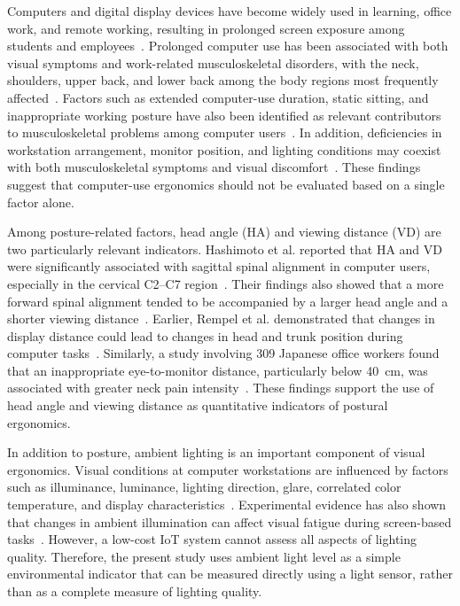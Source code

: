 Computers and digital display devices have become widely used in learning, office work, and remote working, resulting in prolonged screen exposure among students and employees~\cite{ref1,ref2}. Prolonged computer use has been associated with both visual symptoms and work-related musculoskeletal disorders, with the neck, shoulders, upper back, and lower back among the body regions most frequently affected~\cite{ref1,ref2}. Factors such as extended computer-use duration, static sitting, and inappropriate working posture have also been identified as relevant contributors to musculoskeletal problems among computer users~\cite{ref2}. In addition, deficiencies in workstation arrangement, monitor position, and lighting conditions may coexist with both musculoskeletal symptoms and visual discomfort~\cite{ref3}. These findings suggest that computer-use ergonomics should not be evaluated based on a single factor alone.

Among posture-related factors, head angle (HA) and viewing distance (VD) are two particularly relevant indicators. Hashimoto et al. reported that HA and VD were significantly associated with sagittal spinal alignment in computer users, especially in the cervical C2--C7 region~\cite{ref4}. Their findings also showed that a more forward spinal alignment tended to be accompanied by a larger head angle and a shorter viewing distance~\cite{ref4}. Earlier, Rempel et al. demonstrated that changes in display distance could lead to changes in head and trunk position during computer tasks~\cite{ref5}. Similarly, a study involving 309 Japanese office workers found that an inappropriate eye-to-monitor distance, particularly below 40~cm, was associated with greater neck pain intensity~\cite{ref6}. These findings support the use of head angle and viewing distance as quantitative indicators of postural ergonomics.

In addition to posture, ambient lighting is an important component of visual ergonomics. Visual conditions at computer workstations are influenced by factors such as illuminance, luminance, lighting direction, glare, correlated color temperature, and display characteristics~\cite{ref7}. Experimental evidence has also shown that changes in ambient illumination can affect visual fatigue during screen-based tasks~\cite{ref8}. However, a low-cost IoT system cannot assess all aspects of lighting quality. Therefore, the present study uses ambient light level as a simple environmental indicator that can be measured directly using a light sensor, rather than as a complete measure of lighting quality.

